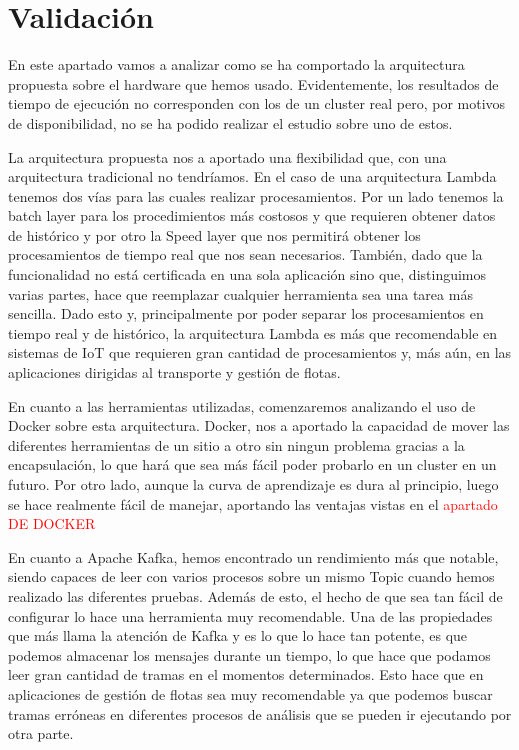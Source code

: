 
\section{Validación}

En este apartado vamos a analizar como se ha comportado la arquitectura propuesta sobre el hardware que hemos usado. Evidentemente, los resultados de tiempo de ejecución no corresponden con los de un cluster real pero, por motivos de disponibilidad, no se ha podido realizar el estudio sobre uno de estos.\par

La arquitectura propuesta nos a aportado una flexibilidad que, con una arquitectura tradicional no tendríamos. En el caso de una arquitectura Lambda tenemos dos vías para las cuales realizar procesamientos. Por un lado tenemos la batch layer para los procedimientos más costosos y que requieren obtener datos de histórico y por otro la Speed layer que nos permitirá obtener los procesamientos de tiempo real que nos sean necesarios. También, dado que la funcionalidad no está certificada en una sola aplicación sino que, distinguimos varias partes, hace que reemplazar cualquier herramienta sea una tarea más sencilla. Dado esto y, principalmente por poder separar los procesamientos en tiempo real y de histórico, la arquitectura Lambda es más que recomendable en sistemas de IoT que requieren gran cantidad de procesamientos y, más aún, en las aplicaciones dirigidas al transporte y gestión de flotas.\par

En cuanto a las herramientas utilizadas, comenzaremos analizando el uso de Docker sobre esta arquitectura. Docker, nos a aportado la capacidad de mover las diferentes herramientas de un sitio a otro sin ningun problema gracias a la encapsulación, lo que hará que sea más fácil poder probarlo en un cluster en un futuro. Por otro lado, aunque la curva de aprendizaje es dura al principio, luego se hace realmente fácil de manejar, aportando las ventajas vistas en el \textcolor{red}{apartado DE DOCKER}\par

En cuanto a Apache Kafka, hemos encontrado un rendimiento más que notable, siendo capaces de leer con varios procesos sobre un mismo Topic cuando hemos realizado las diferentes pruebas. Además de esto, el hecho de que sea tan fácil de configurar lo hace una herramienta muy recomendable. Una de las propiedades que más llama la atención de Kafka y es lo que lo hace tan potente, es que podemos almacenar los mensajes durante un tiempo, lo que hace que podamos leer gran cantidad de tramas en el momentos determinados. Esto hace que en aplicaciones de gestión de flotas sea muy recomendable ya que podemos buscar tramas erróneas en diferentes procesos de análisis que se pueden ir ejecutando por otra parte.\par

